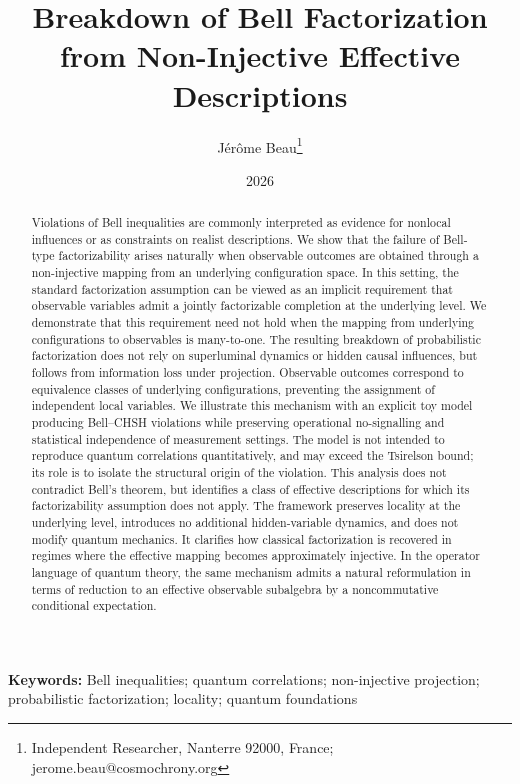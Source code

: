 \documentclass[11pt,a4paper]{article}
\title{Breakdown of Bell Factorization from Non-Injective Effective Descriptions}
\author{J\'er\^ome Beau\thanks{Independent Researcher, Nanterre 92000, France;
  jerome.beau@cosmochrony.org}}
\date{2026}
\theoremstyle{remark}
\begin{document}
\maketitle

\begin{abstract}
  Violations of Bell inequalities are commonly interpreted as evidence
  for nonlocal influences or as constraints on realist descriptions.
  We show that the failure of Bell-type factorizability arises naturally
  when observable outcomes are obtained through a non-injective mapping
  from an underlying configuration space.
  In this setting, the standard factorization assumption can be viewed as
  an implicit requirement that observable variables admit a jointly
  factorizable completion at the underlying level.
  We demonstrate that this requirement need not hold when the mapping
  from underlying configurations to observables is many-to-one.
  The resulting breakdown of probabilistic factorization does not rely on
  superluminal dynamics or hidden causal influences, but follows from
  information loss under projection.
  Observable outcomes correspond to equivalence classes of underlying
  configurations, preventing the assignment of independent local variables.
  We illustrate this mechanism with an explicit toy model producing
  Bell--CHSH violations while preserving operational no-signalling and
  statistical independence of measurement settings.
  The model is not intended to reproduce quantum correlations quantitatively,
  and may exceed the Tsirelson bound; its role is to isolate the structural
  origin of the violation.
  This analysis does not contradict Bell’s theorem, but identifies a class
  of effective descriptions for which its factorizability assumption does
  not apply.
  The framework preserves locality at the underlying level, introduces no
  additional hidden-variable dynamics, and does not modify quantum mechanics.
  It clarifies how classical factorization is recovered in regimes where the
  effective mapping becomes approximately injective.
  In the operator language of quantum theory, the same mechanism admits a natural
  reformulation in terms of reduction to an effective observable subalgebra by a
  noncommutative conditional expectation.
\end{abstract}

\medskip
\noindent\textbf{Keywords:} Bell inequalities; quantum correlations; non-injective projection;
probabilistic factorization; locality; quantum foundations

\clearpage
\tableofcontents
\clearpage
\end{document}
